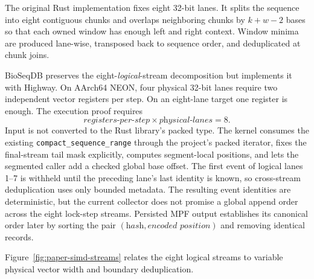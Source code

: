 The original Rust implementation fixes eight 32-bit lanes.  It splits the
sequence into eight contiguous chunks and overlaps neighboring chunks by
$k+w-2$ bases so that each owned window has enough left and right context.
Window minima are produced lane-wise, transposed back to sequence order, and
deduplicated at chunk joins.

BioSeqDB preserves the eight-\emph{logical}-stream decomposition but implements
it with Highway. On AArch64 NEON, four physical 32-bit lanes require two
independent vector registers per step. On an eight-lane target one register is
enough. The execution proof requires
\[
  \textit{registers-per-step}\times\textit{physical-lanes}=8.
\]
Input is not converted to the Rust library's packed type.  The kernel consumes
the existing \texttt{compact\_sequence\_range} through the project's packed
iterator, fixes the final-stream tail mask explicitly, computes segment-local
positions, and lets the segmented caller add a checked global base offset.
The first event of logical lanes 1--7 is withheld until the preceding lane's
last identity is known, so cross-stream deduplication uses only bounded
metadata. The resulting event identities are deterministic, but the current
collector does not promise a global append order across the eight lock-step
streams. Persisted MPF output establishes its canonical order later by sorting
the pair $(\textit{hash},\textit{encoded position})$ and removing identical
records.

Figure~\ref{fig:paper-simd-streams} relates the eight logical streams to
variable physical vector width and boundary deduplication.

